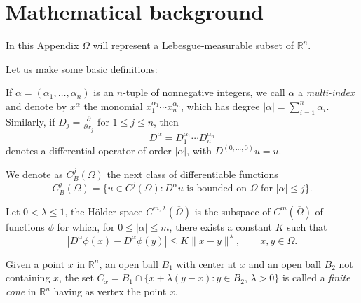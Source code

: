 
\chapter{Mathematical background} %
\label{chap:appendix_maths} %
In this Appendix $\Omega$ will represent a Lebesgue-measurable subset of $\mathbb{R}^n$.

Let us make some basic definitions:
\begin{definition}If $\alpha=(\alpha_1,\ldots,\alpha_n)$ is an $n$-tuple of nonnegative integers, we call $\alpha$ a \emph{multi-index} and denote by $x^\alpha$ the monomial $x_1^{\alpha_1}\cdots x_n^{\alpha_n}$, which has degree $|\alpha|=\sum_{i=1}^n \alpha_i$. Similarly, if $D_j=\frac{\partial}{\partial x_j}$ for $1\leq j\leq n$, then
$$D^\alpha=D_1^{\alpha_1}\cdots D_n^{\alpha_n}$$ denotes a differential operator of order $|\alpha|$, with $D^{(0,\ldots,0)}u=u$.
\end{definition}
\begin{definition}
We denote as $C_B^j(\Omega)$ the next class of differentiable functions $$C_B^j(\Omega)=\{u\in C^j(\Omega):D^\alpha u\text{ is bounded on }\Omega\text{ for } |\alpha|\leq j\}.$$
\end{definition}
\begin{definition}
Let $0<\lambda \leq 1$, the Hölder space $C^{m,\lambda}(\overline{\Omega})$ is the subspace of $C^m(\overline{\Omega})$ of functions $\phi$ for which, for $0\leq |\alpha|\leq m$, there exists a constant $K$ such that $$|D^\alpha \phi(x) -D^\alpha \phi(y)|\leq K \|x-y\|^\lambda,\qquad x,y \in \Omega.$$
\end{definition}
\begin{definition}
Given a point $x$ in $\mathbb{R}^n$, an open ball $B_1$ with center at $x$ and an open ball $B_2$ not containing $x$, the set $C_x=B_1\cap \{x+\lambda(y-x):y\in B_2,\,\lambda >0\}$ is called a \emph{finite cone} in $\mathbb{R}^n$ having as vertex the point $x$.
\end{definition}

